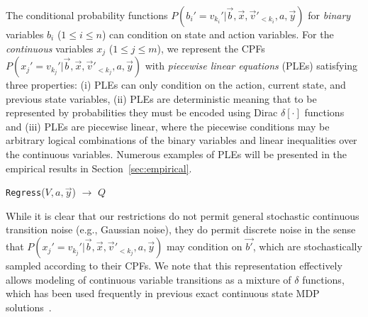 The conditional probability functions
$P(b_i'=v_{k_i}'|\vec{b},\vec{x},\vec{v}'_{<{k_i}},a,\vec{y})$
for \emph{binary} variables $b_i$ ($1 \leq i \leq n$) can condition on
state and action variables.
For the \emph{continuous} variables $x_j$ ($1 \leq j \leq m$), we
represent the CPFs
$P(x_j'=v_{k_j}'|\vec{b},\vec{x},\vec{v}'_{<{k_j}},a,\vec{y})$
with \emph{piecewise linear equations} (PLEs) satisfying three
properties: (i) PLEs can only condition on the action, current state,
and previous state variables, (ii) PLEs are deterministic meaning that
to be represented by probabilities they must be encoded using Dirac
$\delta[\cdot]$ functions and (iii) PLEs are piecewise linear, where
the piecewise conditions may be arbitrary logical combinations of the
binary variables and linear inequalities over the continuous
variables. Numerous examples of PLEs will be presented in the empirical
results in Section~\ref{sec:empirical}.

\incmargin{1.5em}
\linesnumbered
\begin{algorithm}[t!]
\vspace{-.5mm}
\dontprintsemicolon
{}


\caption{\footnotesize \texttt{Regress}($V,a,\vec{y}$) $\longrightarrow$ $Q$ \label{alg:regress}}
\vspace{-1mm}
\end{algorithm}
\decmargin{1.5em}

While it is clear that our restrictions do not permit general
stochastic continuous transition noise (e.g., Gaussian noise),
they do permit discrete noise in the sense that
$P(x_j'=v_{k_j}'|\vec{b},\vec{x},\vec{v}'_{<{k_j}},a,\vec{y})$ may
condition on $\vec{b'}$, which are stochastically sampled according to
their CPFs.  We note that this representation effectively allows
modeling of continuous variable transitions as a mixture of $\delta$
functions, which has been used frequently in previous exact continuous
state MDP solutions~\cite{feng04,hao09}.


